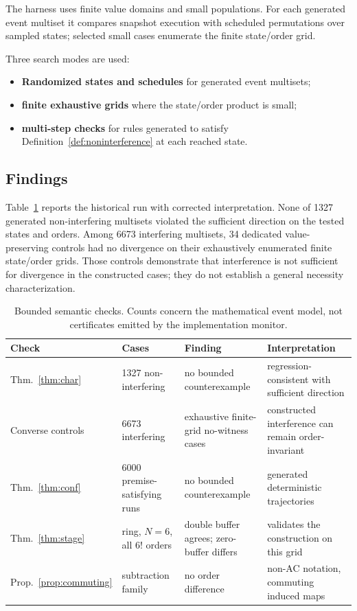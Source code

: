 \documentclass[sigconf,nonacm,review,natbib=true]{acmart}
\theoremstyle{definition}
\theoremstyle{plain}
\theoremstyle{remark}
\begin{document}
The harness uses finite value domains and small populations. For each generated
event multiset it compares snapshot execution with scheduled permutations over
sampled states; selected small cases enumerate the finite state/order grid.

Three search modes are used:

\begin{itemize}
\item \textbf{Randomized states and schedules} for generated event multisets;
\item \textbf{finite exhaustive grids} where the state/order product is small;
\item \textbf{multi-step checks} for rules generated to satisfy
Definition~\ref{def:noninterference} at each reached state.
\end{itemize}

\subsection{Findings}\label{ax:ref:findings}

Table~\ref{tab:referee} reports the historical run with corrected
interpretation. None of 1327 generated non-interfering multisets violated the
sufficient direction on the tested states and orders. Among 6673 interfering
multisets, 34 dedicated value-preserving controls had no divergence on their
exhaustively enumerated finite state/order grids. Those controls demonstrate
that interference is not sufficient for divergence in the constructed cases;
they do not establish a general necessity characterization.

\begin{table}[!ht]
\centering\small
\caption{Bounded semantic checks. Counts concern the mathematical event model,
not certificates emitted by the implementation monitor.}
\label{tab:referee}
\setlength{\tabcolsep}{6pt}
\begin{tabularx}{\textwidth}{@{}l l >{\raggedright\arraybackslash}X >{\raggedright\arraybackslash}X@{}}
\toprule
Check & Cases & Finding & Interpretation \\
\midrule
Thm.~\ref{thm:char} & 1327 non-interfering & no bounded counterexample & regression-consistent with sufficient direction \\
Converse controls & 6673 interfering & 34 exhaustive finite-grid no-witness cases & constructed interference can remain order-invariant \\
Thm.~\ref{thm:conf} & 6000 premise-satisfying runs & no bounded counterexample & generated deterministic trajectories \\
Thm.~\ref{thm:stage} & ring, $N{=}6$, all $6!$ orders & double buffer agrees; zero-buffer differs & validates the construction on this grid \\
Prop.~\ref{prop:commuting} & subtraction family & no order difference & non-AC notation, commuting induced maps \\
\bottomrule
\end{tabularx}

\end{table}
\end{document}

